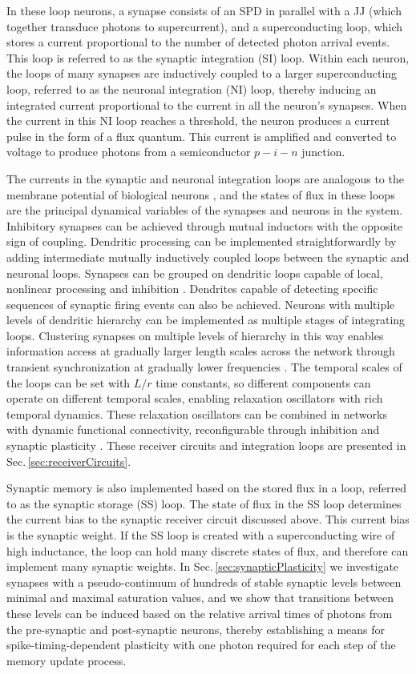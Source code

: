 \documentclass[twocolumn]{article}
\begin{document}
In these loop neurons, a synapse consists of an SPD in parallel with a JJ (which together transduce photons to supercurrent), and a superconducting loop, which stores a current proportional to the number of detected photon arrival events. This loop is referred to as the synaptic integration (SI) loop. Within each neuron, the loops of many synapses are inductively coupled to a larger superconducting loop, referred to as the neuronal integration (NI) loop, thereby inducing an integrated current proportional to the current in all the neuron's synapses. When the current in this NI loop reaches a threshold, the neuron produces a current pulse in the form of a flux quantum. This current is amplified and converted to voltage to produce photons from a semiconductor $p-i-n$ junction.

The currents in the synaptic and neuronal integration loops are analogous to the membrane potential of biological neurons \cite{daab2001}, and the states of flux in these loops are the principal dynamical variables of the synapses and neurons in the system. Inhibitory synapses can be achieved through mutual inductors with the opposite sign of coupling. Dendritic processing can be implemented straightforwardly by adding intermediate mutually inductively coupled loops between the synaptic and neuronal loops. Synapses can be grouped on dendritic loops capable of local, nonlinear processing and inhibition \cite{sase2001,bu2006,robu2015}. Dendrites capable of detecting specific sequences of synaptic firing events \cite{thde2001,haah2015} can also be achieved. Neurons with multiple levels of dendritic hierarchy can be implemented as multiple stages of integrating loops. Clustering synapses on multiple levels of hierarchy in this way enables information access at gradually larger length scales across the network through transient synchronization at gradually lower frequencies \cite{stsa2000}. The temporal scales of the loops can be set with $L/r$ time constants, so different components can operate on different temporal scales, enabling relaxation oscillators with rich temporal dynamics. These relaxation oscillators can be combined in networks with dynamic functional connectivity, reconfigurable through inhibition and synaptic plasticity \cite{robu2015,fr2015}. These receiver circuits and integration loops are presented in Sec.\,\ref{sec:receiverCircuits}.

Synaptic memory is also implemented based on the stored flux in a loop, referred to as the synaptic storage (SS) loop. The state of flux in the SS loop determines the current bias to the synaptic receiver circuit discussed above. This current bias is the synaptic weight. If the SS loop is created with a superconducting wire of high inductance, the loop can hold many discrete states of flux, and therefore can implement many synaptic weights. In Sec.\,\ref{sec:synapticPlasticity} we investigate synapses with a pseudo-continuum of hundreds of stable synaptic levels between minimal and maximal saturation values, and we show that transitions between these levels can be induced based on the relative arrival times of photons from the pre-synaptic and post-synaptic neurons, thereby establishing a means for spike-timing-dependent plasticity with one photon required for each step of the memory update process. 
\end{document}
